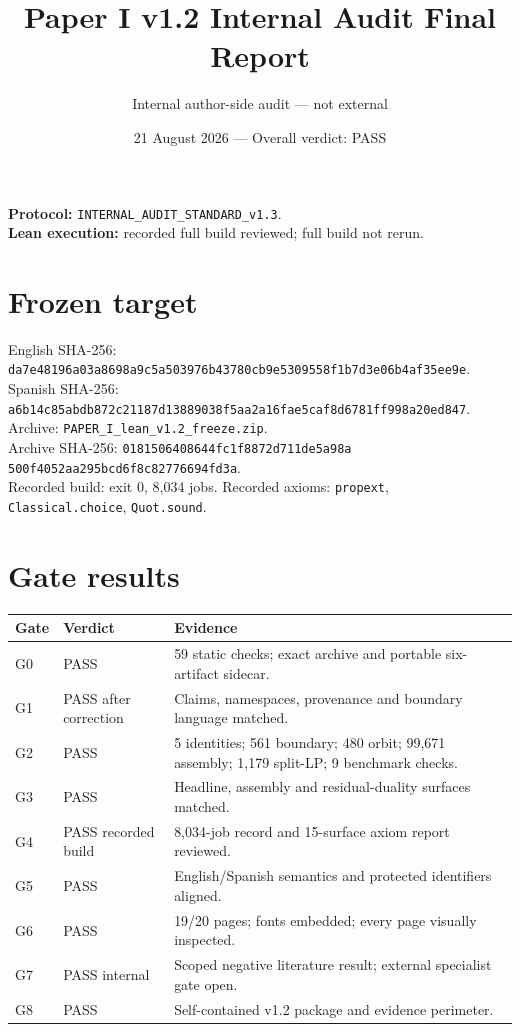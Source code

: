 \documentclass[11pt]{article}
\title{Paper I v1.2 Internal Audit Final Report}
\author{Internal author-side audit --- not external}
\date{21 August 2026 --- Overall verdict: PASS}
\begin{document}
\maketitle
\textbf{Protocol:} \texttt{INTERNAL\_AUDIT\_STANDARD\_v1.3}.\\
\textbf{Lean execution:} recorded full build reviewed; full build not rerun.
\section{Frozen target}
English SHA-256: \texttt{da7e48196a03a8698a9c5a503976b43780cb9e5309558f1b7d3e06b4af35ee9e}.\\
Spanish SHA-256: \texttt{a6b14c85abdb872c21187d13889038f5aa2a16fae5caf8d6781ff998a20ed847}.\\
Archive: \texttt{PAPER\_I\_lean\_v1.2\_freeze.zip}.\\
Archive SHA-256: \texttt{0181506408644fc1f8872d711de5a98a}\newline
\texttt{500f4052aa295bcd6f8c82776694fd3a}.\\
Recorded build: exit 0, 8,034 jobs. Recorded axioms: \texttt{propext},
\texttt{Classical.choice}, \texttt{Quot.sound}.
\section{Gate results}
\begin{longtable}{p{.18\linewidth}p{.20\linewidth}p{.52\linewidth}}
\toprule Gate & Verdict & Evidence \\ \midrule
G0 & PASS & 59 static checks; exact archive and portable six-artifact sidecar. \\
G1 & PASS after correction & Claims, namespaces, provenance and boundary language matched. \\
G2 & PASS & 5 identities; 561 boundary; 480 orbit; 99,671 assembly; 1,179 split-LP; 9 benchmark checks. \\
G3 & PASS & Headline, assembly and residual-duality surfaces matched. \\
G4 & PASS recorded build & 8,034-job record and 15-surface axiom report reviewed. \\
G5 & PASS & English/Spanish semantics and protected identifiers aligned. \\
G6 & PASS & 19/20 pages; fonts embedded; every page visually inspected. \\
G7 & PASS internal & Scoped negative literature result; external specialist gate open. \\
G8 & PASS & Self-contained v1.2 package and evidence perimeter. \\
\bottomrule\end{longtable}
\end{document}
